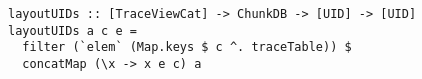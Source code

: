 \begin{tcolorbox}
\begin{verbatim}
layoutUIDs :: [TraceViewCat] -> ChunkDB -> [UID] -> [UID]
layoutUIDs a c e =
  filter (`elem` (Map.keys $ c ^. traceTable)) $
  concatMap (\x -> x e c) a
\end{verbatim}
\end{tcolorbox}


%
%
%
%


